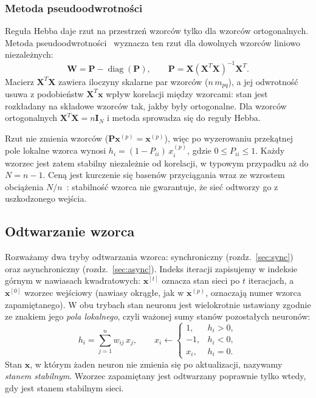 \documentclass{article}
\begin{document}
\subsubsection{Metoda pseudoodwrotności}
\label{sec:pseudoinv}
Reguła Hebba daje rzut na przestrzeń wzorców tylko dla wzorców ortogonalnych.
Metoda pseudoodwrotności~\cite{personnaz1985} wyznacza ten rzut dla dowolnych wzorców liniowo niezależnych:
\[
  \mathbf{W} = \mathbf{P} - \operatorname{diag}(\mathbf{P}),
  \qquad
  \mathbf{P} = \mathbf{X}\left(\mathbf{X}^{T}\mathbf{X}\right)^{-1}\mathbf{X}^{T}.
\]
Macierz $\mathbf{X}^{T}\mathbf{X}$ zawiera iloczyny skalarne par wzorców ($n\, m_{pq}$),
a jej odwrotność usuwa z podobieństw $\mathbf{X}^{T}\mathbf{x}$ wpływ korelacji między wzorcami:
stan jest rozkładany na składowe wzorców tak, jakby były ortogonalne.
Dla wzorców ortogonalnych $\mathbf{X}^{T}\mathbf{X} = n\mathbf{I}_{N}$ i metoda sprowadza się do reguły Hebba.

Rzut nie zmienia wzorców ($\mathbf{P}\mathbf{x}^{(p)} = \mathbf{x}^{(p)}$),
więc po wyzerowaniu przekątnej pole lokalne wzorca wynosi $h_i = (1 - P_{ii})\, x^{(p)}_i$, gdzie $0 \le P_{ii} \le 1$.
Każdy wzorzec jest zatem stabilny niezależnie od korelacji, w typowym przypadku aż do $N = n - 1$.
Ceną jest kurczenie się basenów przyciągania wraz ze wzrostem obciążenia $N/n$~\cite{kanter1987}:
stabilność wzorca nie gwarantuje, że sieć odtworzy go z uszkodzonego wejścia.


\subsection{Odtwarzanie wzorca}
\label{sec:odtwarzanie}
Rozważamy dwa tryby odtwarzania wzorca: synchroniczny (rozdz.~\ref{sec:sync}) oraz asynchroniczny (rozdz.~\ref{sec:async}).
Indeks iteracji zapisujemy w indeksie górnym w nawiasach kwadratowych:
$\mathbf{x}^{[t]}$ oznacza stan sieci po $t$ iteracjach, a $\mathbf{x}^{[0]}$ wzorzec wejściowy
(nawiasy okrągłe, jak w $\mathbf{x}^{(p)}$, oznaczają numer wzorca zapamiętanego).
W obu trybach stan neuronu jest wielokrotnie ustawiany zgodnie ze znakiem jego \emph{pola lokalnego},
czyli ważonej sumy stanów pozostałych neuronów:
\[
  h_i = \sum_{j=1}^{n} w_{ij}\, x_j ,
  \qquad
  x_i \leftarrow
  \begin{cases}
    1,   & h_i > 0, \\
    -1,  & h_i < 0, \\
    x_i, & h_i = 0.
  \end{cases}
\]
Stan $\mathbf{x}$, w którym żaden neuron nie zmienia się po aktualizacji, nazywamy \emph{stanem stabilnym}.
Wzorzec zapamiętany jest odtwarzany poprawnie tylko wtedy, gdy jest stanem stabilnym sieci.
\end{document}
